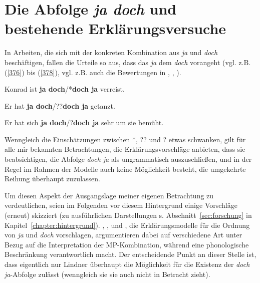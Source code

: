 \section{Die Abfolge \textit{ja doch} und bestehende Erklärungsversuche}
\label{sec:abfolgejd}
In Arbeiten, die sich mit der konkreten Kombination aus \textit{ja} und \textit{doch} beschäftigen, fallen die Urteile so aus, dass das \textit{ja} dem \textit{doch} vorangeht (vgl. z.B. (\ref{376}) bis (\ref{378}), vgl. z.B. auch die Bewertungen in \citealt[101]{Meibauer1994}, \citealt[93]{Ormelius-Sandblom1997}, \citealt[431]{Rinas2007}).
\setcounter{equation}{0}
\begin{exe}
	\ex\label{376} 
	Konrad ist \textbf{ja doch}/*\textbf{doch ja} verreist.
\hfill\hbox {\citet[114]{Doherty1987}}
\end{exe}
\vspace{-0.5cm}
\begin{exe}
	\ex\label{377} 
	Er hat \textbf{ja doch}/??\textbf{doch ja} getanzt.
\hfill\hbox {\citet[20]{Struckmeier2014}}
\end{exe}
\vspace{-0.5cm}
\begin{exe}
	\ex\label{378} 
	Er hat sich \textbf{ja doch}/?\textbf{doch ja} sehr um sie bemüht.
\hfill\hbox {\citet[157]{Jacobs1991}}
\end{exe}
Wenngleich die Einschätzungen zwischen *, ?? und ? etwas schwanken, gilt für alle mir bekannten Betrachtungen, die Erklärungsvorschläge anbieten, dass sie beabsichtigen, die Abfolge \textit{doch ja} als ungrammatisch auszuschließen, und in der Regel im Rahmen der Modelle auch keine Möglichkeit besteht, die umgekehrte Reihung überhaupt zuzulassen.

Um diesen Aspekt der Ausgangslage meiner eigenen Betrachtung zu verdeutlichen, seien im Folgenden vor diesem Hintergrund einige Vorschläge (erneut) skizziert (zu ausführlichen Darstellungen s. Abschnitt~\ref{sec:forschung} in Kapitel~\ref{chapter:hintergrund}). \citet{Doherty1985, Doherty1987}, \citet{Ickler1994}, \citet{Ormelius-Sandblom1997} und \citet{Rinas2007}, die Erklärungsmodelle für die Ordnung von \textit{ja} und \textit{doch} vorschlagen, argumentieren dabei auf verschiedene Art unter Bezug auf die Interpretation der MP-Kombination, während \citet{Lindner1991} eine phonologische Beschränkung verantwortlich macht. Der entscheidende Punkt an dieser Stelle ist, dass eigentlich nur Lindner überhaupt die Möglichkeit für die Existenz der \textit{doch ja}-Abfolge zulässt (wenngleich sie sie auch nicht in Betracht zieht).


